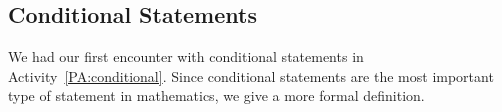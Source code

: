 \subsection*{Conditional Statements}\label{SS:conditional}
We had our first encounter with conditional statements in \typeu Activity~\ref*{PA:conditional}.  %
Since conditional statements are the most important type of statement in mathematics, we give a more formal definition.

